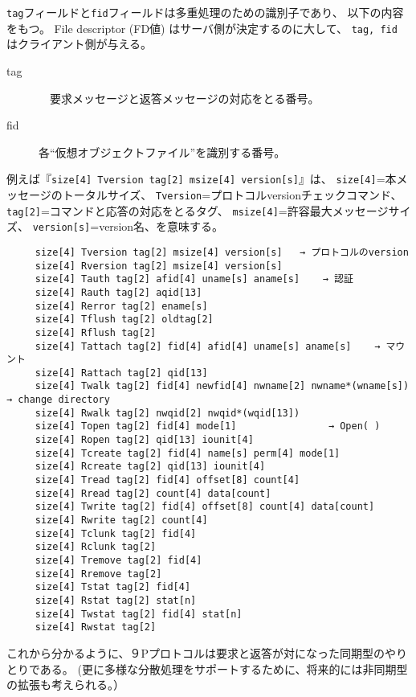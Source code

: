 {\tt tag}フィールドと{\tt fid}フィールドは多重処理のための識別子であり、
以下の内容をもつ。
File descriptor (FD値) はサーバ側が決定するのに大して、
{\tt tag, fid} はクライアント側が与える。

\begin{description}
\item[tag]　要求メッセージと返答メッセージの対応をとる番号。
\item[fid]  各``仮想オブジェクトファイル''を識別する番号。
\end{description}




例えば『{\tt size[4] Tversion tag[2] msize[4] version[s]}』は、
  {\tt size[4]}=本メッセージのトータルサイズ、
  {\tt Tversion}=プロトコルversionチェックコマンド、
  {\tt tag[2]}=コマンドと応答の対応をとるタグ、
  {\tt msize[4]}=許容最大メッセージサイズ、
  {\tt version[s]}=version名、を意味する。
    
{\small
\begin{verbatim}
     size[4] Tversion tag[2] msize[4] version[s]   → プロトコルのversion
     size[4] Rversion tag[2] msize[4] version[s]
     size[4] Tauth tag[2] afid[4] uname[s] aname[s]    → 認証
     size[4] Rauth tag[2] aqid[13]
     size[4] Rerror tag[2] ename[s]
     size[4] Tflush tag[2] oldtag[2]
     size[4] Rflush tag[2]
     size[4] Tattach tag[2] fid[4] afid[4] uname[s] aname[s]    → マウント
     size[4] Rattach tag[2] qid[13]
     size[4] Twalk tag[2] fid[4] newfid[4] nwname[2] nwname*(wname[s])  → change directory
     size[4] Rwalk tag[2] nwqid[2] nwqid*(wqid[13])
     size[4] Topen tag[2] fid[4] mode[1]                → Open( )
     size[4] Ropen tag[2] qid[13] iounit[4]
     size[4] Tcreate tag[2] fid[4] name[s] perm[4] mode[1]
     size[4] Rcreate tag[2] qid[13] iounit[4]
     size[4] Tread tag[2] fid[4] offset[8] count[4]
     size[4] Rread tag[2] count[4] data[count]
     size[4] Twrite tag[2] fid[4] offset[8] count[4] data[count]
     size[4] Rwrite tag[2] count[4]
     size[4] Tclunk tag[2] fid[4]
     size[4] Rclunk tag[2]
     size[4] Tremove tag[2] fid[4]
     size[4] Rremove tag[2]
     size[4] Tstat tag[2] fid[4]
     size[4] Rstat tag[2] stat[n]
     size[4] Twstat tag[2] fid[4] stat[n]
     size[4] Rwstat tag[2]
\end{verbatim}
}

  これから分かるように、９Pプロトコルは要求と返答が対になった同期型のやりとりである。
  (更に多様な分散処理をサポートするために、将来的には非同期型の拡張も考えられる。）



